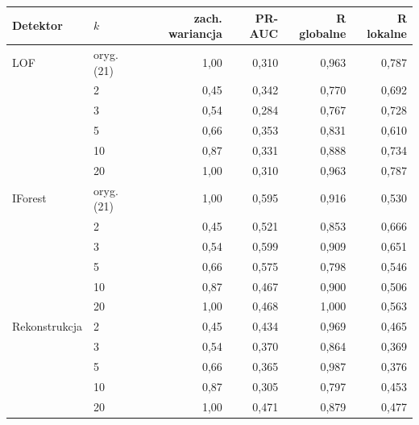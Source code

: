 \begin{tabular}{llrrrr}
\toprule
Detektor & $k$ & zach. wariancja & PR-AUC & R globalne & R lokalne \\
\midrule
LOF & oryg. (21) & 1,00 & 0,310 & 0,963 & 0,787 \\
 & 2 & 0,45 & 0,342 & 0,770 & 0,692 \\
 & 3 & 0,54 & 0,284 & 0,767 & 0,728 \\
 & 5 & 0,66 & 0,353 & 0,831 & 0,610 \\
 & 10 & 0,87 & 0,331 & 0,888 & 0,734 \\
 & 20 & 1,00 & 0,310 & 0,963 & 0,787 \\
IForest & oryg. (21) & 1,00 & 0,595 & 0,916 & 0,530 \\
 & 2 & 0,45 & 0,521 & 0,853 & 0,666 \\
 & 3 & 0,54 & 0,599 & 0,909 & 0,651 \\
 & 5 & 0,66 & 0,575 & 0,798 & 0,546 \\
 & 10 & 0,87 & 0,467 & 0,900 & 0,506 \\
 & 20 & 1,00 & 0,468 & 1,000 & 0,563 \\
Rekonstrukcja & 2 & 0,45 & 0,434 & 0,969 & 0,465 \\
 & 3 & 0,54 & 0,370 & 0,864 & 0,369 \\
 & 5 & 0,66 & 0,365 & 0,987 & 0,376 \\
 & 10 & 0,87 & 0,305 & 0,797 & 0,453 \\
 & 20 & 1,00 & 0,471 & 0,879 & 0,477 \\
\bottomrule
\end{tabular}
